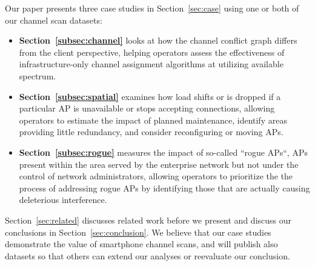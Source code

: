 Our paper presents three case studies in Section~\ref{sec:case} using one or
both of our channel scan datasets:
%
\begin{itemize}
%
\item \textbf{Section~\ref{subsec:channel}} looks at how the channel conflict
graph differs from the client perspective, helping operators assess the
effectiveness of infrastructure-only channel assignment algorithms at
utilizing available spectrum.
%
\item \textbf{Section~\ref{subsec:spatial}} examines how load shifts or is
dropped if a particular AP is unavailable or stops accepting connections, allowing operators to estimate the impact of
planned maintenance, identify areas providing little redundancy, and consider
reconfiguring or moving APs.
%
\item \textbf{Section~\ref{subsec:rogue}} measures the impact of so-called
``rogue APs``, APs present within the area served by the enterprise network
but not under the control of network administrators,
allowing operators to prioritize the the process of addressing rogue APs by
identifying those that are actually causing deleterious interference.
%
\end{itemize}

Section~\ref{sec:related} discusses related work before we present and
discuss our conclusions in Section~\ref{sec:conclusion}. We believe that our
case studies demonstrate the value of smartphone channel scans, and will
publish also datasets so that others can extend our analyses or reevaluate
our conclusion.
